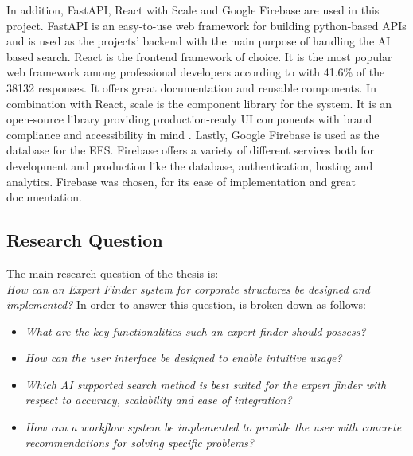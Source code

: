 In addition, FastAPI, React with Scale and Google Firebase are used in this project. FastAPI is an easy-to-use web framework for building python-based \acp{API} \parencite{noauthor_fastapi_nodate} and is used as the projects' backend with the main purpose of handling the \ac{AI} based search. React is the frontend framework of choice. It is the most popular web framework among professional developers according to \textcite{noauthor_technology_nodate} with 41.6\% of the 38132 responses. It offers great documentation and reusable components. In combination with React, scale is the component library for the system. It is an open-source library providing production-ready UI components with brand compliance and accessibility in mind \parencite{noauthor_faq_nodate}. Lastly, Google Firebase is used as the database for the \ac{EFS}. Firebase offers a variety of different services both for development and production like the database, authentication, hosting and analytics. Firebase was chosen, for its ease of implementation and great documentation.


\subsection{Research Question}
The main research question of the thesis is: \\
\textit{How can an Expert Finder system for corporate structures be designed and implemented?}
In order to answer this question, is broken down as follows: 
\begin{itemize}
    \item \textit{What are the key functionalities such an expert finder should possess?} 
    \item \textit{How can the user interface be designed to enable intuitive usage?}
    \item \textit{Which \ac{AI} supported search method is best suited for the expert finder with respect to accuracy, scalability and ease of integration?}
    \item \textit{How can a workflow system be implemented to provide the user with concrete recommendations for solving specific problems?}
\end{itemize}

